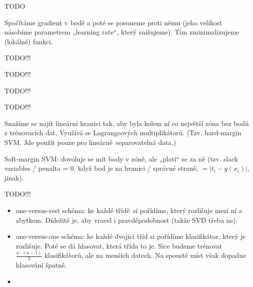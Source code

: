 \documentclass[12pt]{article}					%
\begin{document}
TODO

\begin{definice}
	Spočítáme gradient v bodě a poté se posuneme proti němu (jeho velikost násobíme parametrem „learning rate“, který snižujeme). Tím zminimalizujeme (lokálně) funkci.
\end{definice}


TODO!!!


TODO!!!


TODO!!!


TODO!!!


\begin{definice}
	Snažíme se najít lineární hranici tak, aby byla kolem ní co největší zóna bez bodů z trénovacích dat. Využívá se Lagrangeových multiplikátorů. (Tzv. hard-margin SVM. Jde použít pouze pro lineárně separovatelná data.)

	Soft-margin SVM: dovoluje se mít body v zóně, ale „platí“ se za ně (tzv. slack variables / penalta = 0, když bod je na hranici / správné straně, $ = |t_i - y(x_i)|$, jinak).
\end{definice}

TODO!!!

\begin{definice}
	\begin{itemize}
		\item one-versus-rest schéma: ke každé třídě si pořídíme, který rozlišuje mezi ní a zbytkem. Důležité je, aby vracel i pravděpodobnost (takže SVD třeba ne).
		\item one-versus-one schéma: ke každé dvojici tříd si pořídíme klasifikátor, který je rozlišuje. Poté se dá hlasovat, která třída to je. Sice budeme trénovat $\frac{n·(n-1)}{2}$ klasifikátorů, ale na menších datech. Na spoustě míst však dopadne hlasování špatně.
		\item 
	\end{itemize}
\end{definice}
\end{document}
